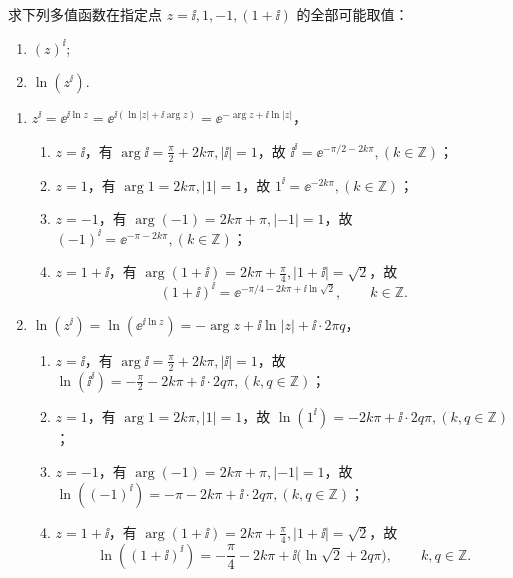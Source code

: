 \begin{question}
求下列多值函数在指定点 \(z = \ii, 1, -1, (1+\ii)\) 的全部可能取值：
\begin{enumerate}
  \item \((z)^{\ii}\);
  \item \(\ln(z^{\ii})\).
\end{enumerate}
\begin{solution}
\begin{enumerate}
  \item \(z^{\ii}=\ee^{\ii \ln z}= \ee^{\ii (\ln|z|+\ii \arg z)}=\ee^{-\arg z+\ii \ln|z|}\)，
\begin{enumerate}
    \item \(z=\ii\)，有 \(\arg \ii = \frac{\pi}{2} + 2k \pi, |\ii|=1\)，故 \(\ii^{\ii}=\ee^{-\pi/2-2k \pi},(k \in \mathbb{Z})\)；
    \item \(z=1\)，有 \(\arg 1=2k \pi, |1|=1\)，故 \(1^{\ii} = \ee^{-2k \pi},(k \in \mathbb{Z})\)；
    \item \(z=-1\)，有 \(\arg (-1)=2k \pi+\pi, |-1|=1\)，故 \((-1)^{\ii} = \ee^{-\pi-2k \pi},(k \in \mathbb{Z})\)；
    \item \(z=1+\ii\)，有 \(\arg (1+\ii)=2k \pi+\frac{\pi}{4}, |1+\ii|=\sqrt{2}\)，故
    \[
    (1+\ii)^{\ii}
    =\ee^{-\pi/4-2k\pi+\ii\ln\sqrt{2}},
    \qquad k\in\mathbb{Z}.
    \]
\end{enumerate}

  \item \(\ln(z^{\ii})=\ln(\ee^{\ii \ln z})=-\arg z+\ii \ln|z| + \ii \cdot 2 \pi q\)，
\begin{enumerate}
    \item \(z=\ii\)，有 \(\arg \ii = \frac{\pi}{2} + 2k \pi, |\ii|=1\)，故 \(\ln(\ii^{\ii})=-\frac{\pi}{2}-2k \pi+\ii \cdot 2q \pi,(k, q \in \mathbb{Z})\)；
    \item \(z=1\)，有 \(\arg 1=2k \pi, |1|=1\)，故 \(\ln(1^{\ii}) = -2k \pi+\ii \cdot 2q \pi,(k, q \in \mathbb{Z})\)；
    \item \(z=-1\)，有 \(\arg (-1)=2k \pi+\pi, |-1|=1\)，故 \(\ln((-1)^{\ii}) = -\pi-2k \pi + \ii \cdot 2q \pi,(k, q \in \mathbb{Z})\)；
    \item \(z=1+\ii\)，有 \(\arg (1+\ii)=2k \pi+\frac{\pi}{4}, |1+\ii|=\sqrt{2}\)，故
    \[
    \ln((1+\ii)^{\ii})
    =-\frac{\pi}{4}-2k\pi
      +\ii\bigl(\ln\sqrt{2}+2q\pi\bigr),
    \qquad k,q\in\mathbb{Z}.
    \]
\end{enumerate}
\end{enumerate}
\end{solution}
\end{question}


